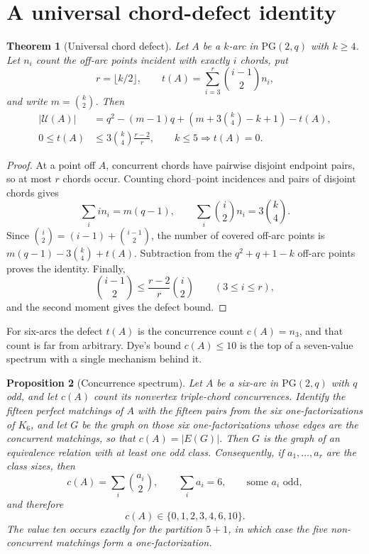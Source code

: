 \documentclass[11pt]{article}
\newtheorem{theorem}{Theorem}[section]
\newtheorem{proposition}[theorem]{Proposition}
\theoremstyle{definition}
\theoremstyle{remark}
\newcommand{\PG}{\mathrm{PG}}
\newcommand{\cU}{\mathcal{U}}
\begin{document}
\section{A universal chord-defect identity}
\label{sec:chord-defect}

\begin{theorem}[Universal chord defect]
\label{lem:chord-defect}
Let $A$ be a $k$-arc in $\PG(2,q)$ with $k\ge4$. Let $n_i$ count the
off-arc points incident with exactly $i$ chords, put
\[
 r=\lfloor k/2\rfloor,\qquad
 t(A)=\sum_{i=3}^{r}\binom{i-1}{2}n_i,
\]
and write $m=\binom{k}{2}$. Then
\[
\begin{aligned}
 |\cU(A)|&=q^2-(m-1)q+
 \left(m+3\binom{k}{4}-k+1\right)-t(A),\\
 0\le t(A)&\le3\binom{k}{4}\frac{r-2}{r},
 \qquad k\le5\Longrightarrow t(A)=0.
\end{aligned}
\]
\end{theorem}

\begin{proof}
At a point off $A$, concurrent chords have pairwise disjoint endpoint
pairs, so at most $r$ chords occur. Counting chord--point incidences and
pairs of disjoint chords gives
\[
 \sum_i i n_i=m(q-1),\qquad
 \sum_i\binom{i}{2}n_i=3\binom{k}{4}.
\]
Since $\binom{i}{2}=(i-1)+\binom{i-1}{2}$, the number of covered off-arc
points is $m(q-1)-3\binom{k}{4}+t(A)$. Subtraction from the
$q^2+q+1-k$ off-arc points proves the identity. Finally,
\[
 \binom{i-1}{2}\le\frac{r-2}{r}\binom{i}{2}\qquad(3\le i\le r),
\]
and the second moment gives the defect bound.
\end{proof}

For six-arcs the defect $t(A)$ is the concurrence count $c(A)=n_3$, and
that count is far from arbitrary.  Dye's bound $c(A)\le10$ is the top of a
seven-value spectrum with a single mechanism behind it.

\begin{proposition}[Concurrence spectrum]
\label{prop:concurrence-spectrum}
Let $A$ be a six-arc in $\PG(2,q)$ with $q$ odd, and let $c(A)$ count its
nonvertex triple-chord concurrences.  Identify the fifteen perfect
matchings of $A$ with the fifteen pairs from the six one-factorizations of
$K_6$, and let $G$ be the graph on those six one-factorizations whose edges
are the concurrent matchings, so that $c(A)=|E(G)|$.  Then $G$ is the graph
of an equivalence relation with at least one odd class.  Consequently, if
$a_1,\ldots,a_r$ are the class sizes, then
\[
 c(A)=\sum_{i}\binom{a_i}{2},\qquad \sum_i a_i=6,
 \qquad\text{some }a_i\text{ odd},
\]
and therefore
\[
 c(A)\in\{0,1,2,3,4,6,10\}.
\]
The value ten occurs exactly for the partition $5+1$, in which case the
five non-concurrent matchings form a one-factorization.
\end{proposition}
\end{document}
